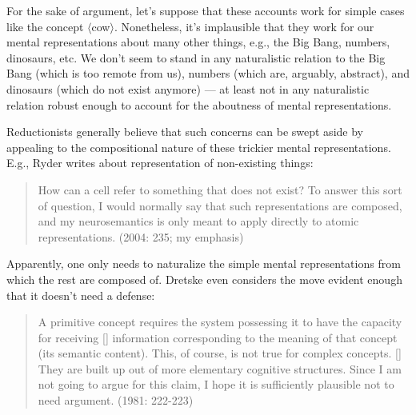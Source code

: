 \documentclass[a4paper,12pt]{article}
\begin{document}

For the sake of argument, let's suppose that these accounts work for simple cases like the concept $\langle$cow$\rangle$. Nonetheless, it's implausible that they work for our mental representations about many other things, e.g., the Big Bang, numbers, dinosaurs, etc. We don't seem to stand in any naturalistic relation to the Big Bang (which is too remote from us), numbers (which are, arguably, abstract), and dinosaurs (which do not exist anymore) --- at least not in any naturalistic relation robust enough to account for the aboutness of mental representations.

Reductionists generally believe that such concerns can be swept aside by appealing to the compositional nature of these trickier mental representations. E.g., Ryder writes about representation of non-existing things:

\begin{quote}

How can a cell refer to something that does not exist? To answer this sort of question, I would normally say that such representations are composed, and my neurosemantics is only meant to apply directly to atomic representations. (2004: 235; my emphasis)

\end{quote}

Apparently, one only needs to naturalize the simple mental representations from which the rest are composed of. Dretske even considers the move evident enough that it doesn't need a defense:

\begin{quote}

A primitive concept requires the system possessing it to have the capacity for receiving [\textellipsis] information corresponding to the meaning of that concept (its semantic content). This, of course, is not true for complex concepts. [\textellipsis] They are built up out of more elementary cognitive structures. Since I am not going to argue for this claim, I hope it is sufficiently plausible not to need argument. (1981: 222-223)

\end{quote}
\end{document}
